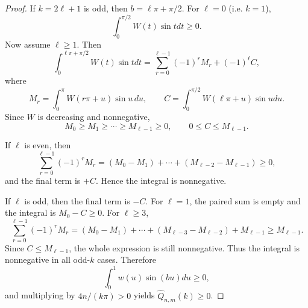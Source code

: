 \documentclass[a4paper,12pt]{amsart}
\theoremstyle{definition}
\theoremstyle{remark}
\begin{document}
\begin{proof}
If $k = 2 \ell +1$ is odd, then $b = \ell\pi + \pi/2$. For $\ell=0$ (i.e. $k=1$),
\[ 
\int_0^{\pi/2}W(t) \sin t dt \ge 0. 
\]
Now assume $\ell \ge 1$. Then 
\[ 
\int_0^{\ell\pi+\pi/2}W(t)\sin t dt = \sum_{r=0}^{\ell-1}(-1)^rM_r + (-1)^\ell C, 
\] 
where
\[ 
M_r =\int_0^\pi W(r\pi+u)\sin u\,du, \qquad C=\int_0^{\pi/2}W(\ell\pi+u) \sin u du. 
\]
Since $W$ is decreasing and nonnegative, 
\[ 
M_0\ge M_1\ge\cdots\ge M_{\ell-1}\ge 0, \qquad 0\le C\le M_{\ell-1}. 
\]

If $\ell$ is even, then 
\[ 
\sum_{r=0}^{\ell-1}(-1)^rM_r = (M_0-M_1)+\cdots+(M_{\ell-2}-M_{\ell-1})\ge0, \] 
and the final term is $+C$. Hence the integral is nonnegative. 

If $\ell$ is odd, then the final term is $-C$. For $\ell=1$, the paired sum is empty and the integral is $M_0-C\ge0$. For $\ell\ge3$,
\[ 
\sum_{r=0}^{\ell-1}(-1)^rM_r = (M_0-M_1) + \cdots + (M_{\ell-3}-M_{\ell-2})+M_{\ell-1} \ge M_{\ell-1}. 
\] 
Since $C \le M_{\ell-1}$, the whole expression is still nonnegative. Thus the integral is nonnegative in all odd-$k$ cases. Therefore 
\[ 
\int_0^1 w(u)\sin(bu) du \ge 0, 
\]
and multiplying by $4n/(k\pi)>0$ yields $\widehat Q_{n,m}(k) \ge 0$.

\end{proof}
\end{document}
